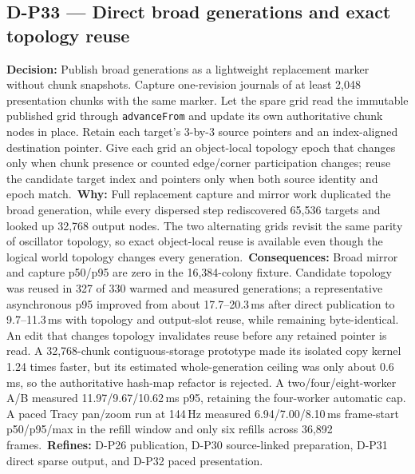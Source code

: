 \subsection*{D-P33 --- Direct broad generations and exact topology reuse}
\begin{decisionbox}[title={D-P33 \quad 2026-08-17}]
\textbf{Decision:} Publish broad generations as a lightweight replacement
marker without chunk snapshots. Capture one-revision journals of at least
2,048 presentation chunks with the same marker. Let the spare grid read the immutable published
grid through \texttt{advanceFrom} and update its own authoritative chunk nodes
in place. Retain each target's 3-by-3 source pointers and an index-aligned
destination pointer. Give each grid an object-local topology epoch that changes
only when chunk presence or counted edge/corner participation changes; reuse the
candidate target index and pointers only when both source identity and epoch
match.\
\textbf{Why:} Full replacement capture and mirror work duplicated the broad
generation, while every dispersed step rediscovered 65,536 targets and looked
up 32,768 output nodes. The two alternating grids revisit the same parity of
oscillator topology, so exact object-local reuse is available even though the
logical world topology changes every generation.\
\textbf{Consequences:} Broad mirror and capture p50/p95 are zero in the
16,384-colony fixture. Candidate topology was reused in 327 of 330 warmed and
measured generations; a representative asynchronous p95 improved from about
17.7--20.3\,ms after direct publication to 9.7--11.3\,ms with topology and
output-slot reuse, while remaining byte-identical. An edit that changes
topology invalidates reuse before any retained pointer is read. A 32,768-chunk
contiguous-storage prototype made its isolated copy kernel 1.24 times faster,
but its estimated whole-generation ceiling was only about 0.6\,ms, so the
authoritative hash-map refactor is rejected. A two/four/eight-worker A/B measured
11.97/9.67/10.62\,ms p95, retaining the four-worker automatic cap. A paced Tracy
pan/zoom run at 144\,Hz measured 6.94/7.00/8.10\,ms frame-start p50/p95/max in
the refill window and only six refills across 36,892 frames.\
\textbf{Refines:} D-P26 publication, D-P30 source-linked preparation, D-P31
direct sparse output, and D-P32 paced presentation.
\end{decisionbox}

